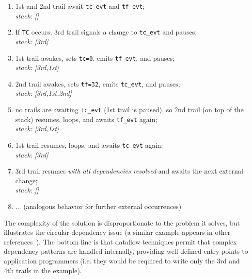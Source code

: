 \documentclass{acm_proc_article-sp}
\newcommand{\code}[1] {{\small{\texttt{#1}}}}
\newcommand{\1}{\;}
\newcommand{\2}{\;\;}
\newcommand{\3}{\;\;\;}
\newcommand{\5}{\;\;\;\;\;}
\begin{document}
{\small
\begin{enumerate}
\setlength{\itemsep}{0pt}
\item 1st and 2nd trail await \code{tc\_evt} and \code{tf\_evt};\\
    \emph{stack: []}
\item If \code{TC} occurs, 3rd trail signals a change to \code{tc\_evt} and 
    pauses;\\
    \emph{stack: [3rd]}
\item 1st trail awakes, sets \code{tc=0}, emits \code{tf\_evt}, and pauses;\\
    \emph{stack: [3rd,1st]}
\item 2nd trail awakes, sets \code{tf=32}, emits \code{tc\_evt}, and pauses;\\
    \emph{stack: [3rd,1st,2nd]}
\item no trails are awaiting \code{tc\_evt} (1st trail is paused), so 2nd trail 
    (on top of the stack) resumes, loops, and awaits \code{tf\_evt} again;\\
    \emph{stack: [3rd,1st]}
\item 1st trail resumes, loops, and awaits \code{tc\_evt} again;\\
    \emph{stack: [3rd]}
\item 3rd trail resumes \emph{with all dependencies resolved} and awaits the 
    next external change;\\
    \emph{stack: []}
\item ... (analogous behavior for further external occurrences)
\end{enumerate}
}

The complexity of the solution is disproportionate to the problem it solves, 
but illustrates the circular dependency issue (a similar example appears in 
other references~\cite{frp.survey,frtime.embedding}).
The bottom line is that dataflow techniques permit that complex dependency 
patterns are handled internally, providing well-defined entry points to 
application programmers (i.e. they would be required to write only the 3rd and 
4th trails in the example).
\end{document}
